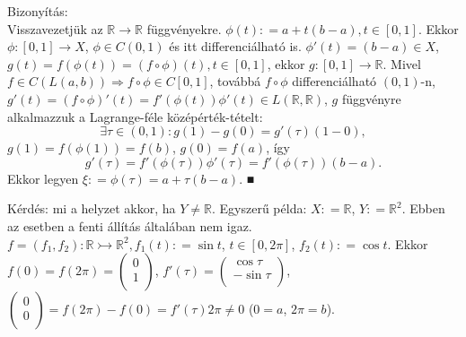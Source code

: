 \documentclass[12pt,a4paper]{scrartcl}
\newenvironment{bizonyitas}{}{}
\begin{document}
\begin{bizonyitas}

Bizonyítás:\\
Visszavezetjük az \(\left. {\mathbb{R}}\rightarrow{\mathbb{R}} \right.\)
függvényekre.
\(\phi\left( t \right): = a + t\left( {b - a} \right),t \in \left\lbrack 0,1 \right\rbrack\).
Ekkor
\(\left. \phi:\left\lbrack 0,1 \right\rbrack\rightarrow X \right.\),
\(\phi \in C\left( 0,1 \right)\) és itt differenciálható is.
\(\phi'\left( t \right) = \left( {b - a} \right) \in X\),
\(g\left( t \right) = f\left( {\phi\left( t \right)} \right) = \left( {f \circ \phi} \right)\left( t \right),t \in \left\lbrack 0,1 \right\rbrack\),
ekkor
\(\left. g:\left\lbrack 0,1 \right\rbrack\rightarrow{\mathbb{R}} \right.\).
Mivel
\(\left. f \in C\left( {L\left( {a,b} \right)} \right)\Rightarrow f \circ \phi \in C\left\lbrack 0,1 \right\rbrack \right.\),
továbbá \(f \circ \phi\) differenciálható \(\left( 0,1 \right)\)-n,
\(g'\left( t \right) = \left( {f \circ \phi} \right)'\left( t \right) = f'\left( {\phi\left( t \right)} \right)\phi'\left( t \right) \in L\left( {{\mathbb{R}},{\mathbb{R}}} \right)\),
\(g\) függvényre alkalmazzuk a Lagrange-féle középérték-tételt:
\[{\exists\tau \in \left( 0,1 \right):g\left( 1 \right) - g\left( 0 \right) = g'\left( \tau \right)\left( {1 - 0} \right)},\]
\(g\left( 1 \right) = f\left( {\phi\left( 1 \right)} \right) = f\left( b \right)\),
\(g\left( 0 \right) = f\left( a \right)\), így
\[{g'\left( \tau \right) = f'\left( {\phi\left( \tau \right)} \right)\phi'\left( \tau \right) = f'\left( {\phi\left( \tau \right)} \right)\left( {b - a} \right)}.\]
Ekkor legyen
\(\xi: = \phi\left( \tau \right) = a + \tau\left( {b - a} \right)\). ■

\end{bizonyitas}

Kérdés: mi a helyzet akkor, ha \(Y \neq {\mathbb{R}}\). Egyszerű példa:
\(X: = {\mathbb{R}}\), \(Y: = {\mathbb{R}}^{2}\). Ebben az esetben a
fenti állítás általában nem igaz.
\(\left. f = \left( {f_{1},f_{2}} \right):{\mathbb{R}}\rightarrowtail{\mathbb{R}}^{2},f_{1}\left( t \right): = \sin t \right.\),
\(t \in \left\lbrack {0,2\pi} \right\rbrack\),
\(f_{2}\left( t \right): = \cos t\). Ekkor
\(f\left( 0 \right) = f\left( {2\pi} \right) = \left( \begin{array}{l} 0 \\ 1 \\ \end{array} \right)\),
\(f'\left( \tau \right) = \left( \begin{array}{l} {\cos\tau} \\ {- \sin\tau} \\ \end{array} \right)\),
\(\left( \begin{array}{l} 0 \\ 0 \\ \end{array} \right) = f\left( {2\pi} \right) - f\left( 0 \right) = f'\left( \tau \right)2\pi \neq 0\)
(\(0 = a\), \(2\pi = b\)).
\end{document}
